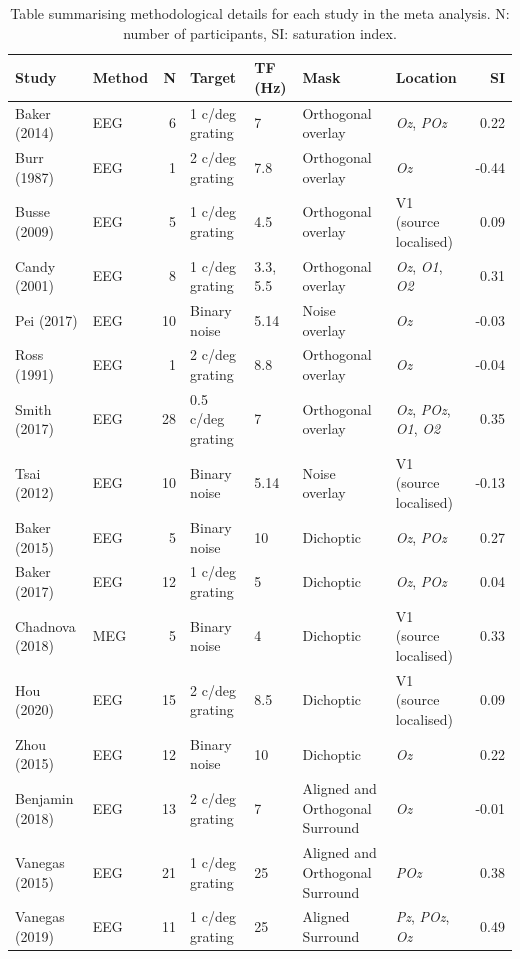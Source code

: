 \documentclass[]{article}
\begin{document}
\begin{table}

\caption{\label{tab:metatable}Table summarising methodological details for each study in the meta analysis. N: number of participants, SI: saturation index.}
\centering
\begin{tabular}[t]{l|l|r|l|l|l|l|r}
Study & Method & N & Target & TF (Hz) & Mask & Location & SI\\
\hline
Baker (2014) & EEG & 6 & 1 c/deg grating & 7 & Orthogonal overlay & \emph{Oz}, \emph{POz} & 0.22\\
Burr (1987) & EEG & 1 & 2 c/deg grating & 7.8 & Orthogonal overlay & \emph{Oz} & -0.44\\
Busse (2009) & EEG & 5 & 1 c/deg grating & 4.5 & Orthogonal overlay & V1 (source localised) & 0.09\\
Candy (2001) & EEG & 8 & 1 c/deg grating & 3.3, 5.5 & Orthogonal overlay & \emph{Oz}, \emph{O1}, \emph{O2} & 0.31\\
Pei (2017) & EEG & 10 & Binary noise & 5.14 & Noise overlay & \emph{Oz} & -0.03\\
Ross (1991) & EEG & 1 & 2 c/deg grating & 8.8 & Orthogonal overlay & \emph{Oz} & -0.04\\
Smith (2017) & EEG & 28 & 0.5 c/deg grating & 7 & Orthogonal overlay & \emph{Oz}, \emph{POz}, \emph{O1}, \emph{O2} & 0.35\\
Tsai (2012) & EEG & 10 & Binary noise & 5.14 & Noise overlay & V1 (source localised) & -0.13\\
\hline
Baker (2015) & EEG & 5 & Binary noise & 10 & Dichoptic & \emph{Oz}, \emph{POz} & 0.27\\
Baker (2017) & EEG & 12 & 1 c/deg grating & 5 & Dichoptic & \emph{Oz}, \emph{POz} & 0.04\\
Chadnova (2018) & MEG & 5 & Binary noise & 4 & Dichoptic & V1 (source localised) & 0.33\\
Hou (2020) & EEG & 15 & 2 c/deg grating & 8.5 & Dichoptic & V1 (source localised) & 0.09\\
Zhou (2015) & EEG & 12 & Binary noise & 10 & Dichoptic & \emph{Oz} & 0.22\\
\hline
Benjamin (2018) & EEG & 13 & 2 c/deg grating & 7 & Aligned and Orthogonal Surround & \emph{Oz} & -0.01\\
Vanegas (2015) & EEG & 21 & 1 c/deg grating & 25 & Aligned and Orthogonal Surround & \emph{POz} & 0.38\\
Vanegas (2019) & EEG & 11 & 1 c/deg grating & 25 & Aligned Surround & \emph{Pz}, \emph{POz}, \emph{Oz} & 0.49\\
\end{tabular}
\end{table}
\end{document}
